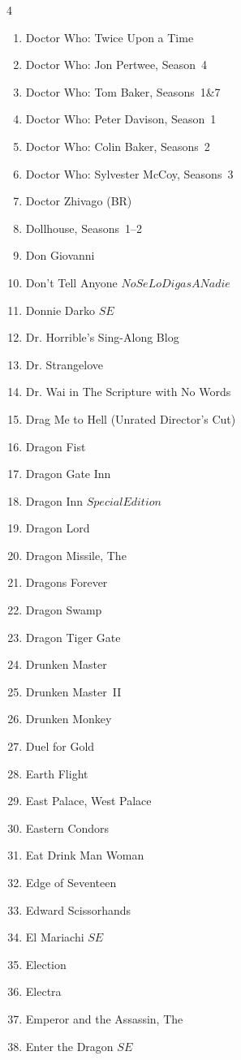 \documentclass{article}
\newcommand\SE{\(SE\)}
\begin{document}
\begin{multicols}{4}
\begin{enumerate}
\item Doctor Who: Twice Upon a Time
\item Doctor Who: Jon Pertwee, Season~4
\item Doctor Who: Tom Baker, Seasons~1\&7
\item Doctor Who: Peter Davison, Season~1
\item Doctor Who: Colin Baker, Seasons~2
\item Doctor Who: Sylvester McCoy, Seasons~3
\item Doctor Zhivago (BR)
\item Dollhouse, Seasons~1--2
\item Don Giovanni
\item Don't Tell Anyone \(No Se Lo Digas A Nadie\)
\item Donnie Darko \SE
\item Dr. Horrible's Sing-Along Blog
\item Dr. Strangelove
\item Dr. Wai in The Scripture with No Words
\item Drag Me to Hell (Unrated Director's Cut)
\item Dragon Fist
\item Dragon Gate Inn
\item Dragon Inn \(Special Edition\)
\item Dragon Lord
\item Dragon Missile, The
\item Dragons Forever
\item Dragon Swamp
\item Dragon Tiger Gate
\item Drunken Master
\item Drunken Master~II
\item Drunken Monkey
\item Duel for Gold
\item Earth Flight
\item East Palace, West Palace
\item Eastern Condors
\item Eat Drink Man Woman
\item Edge of Seventeen
\item Edward Scissorhands
\item El Mariachi \SE
\item Election
\item Electra
\item Emperor and the Assassin, The
\item Enter the Dragon \SE

\end{enumerate}
\end{multicols}
\end{document}
